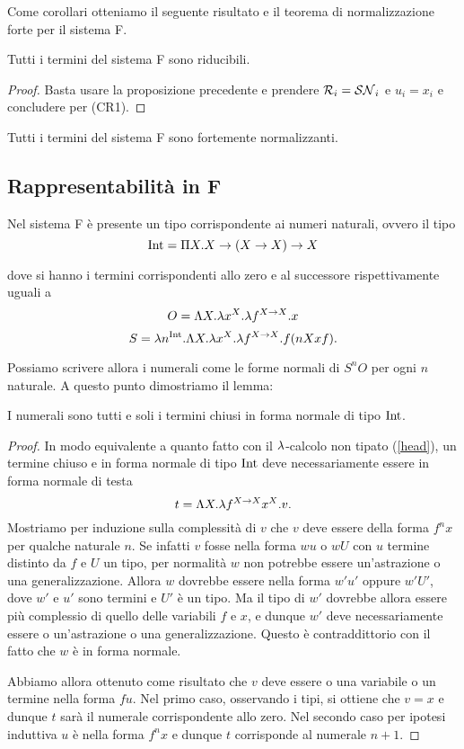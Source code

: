 \documentclass[]{marticle}
\begin{document}
Come corollari otteniamo il seguente risultato e il teorema di normalizzazione
forte per il sistema F.

\begin{block} [Proposizione]
    Tutti i termini del sistema F sono riducibili.
\begin{proof}
    Basta usare la proposizione precedente e prendere $\mathcal{R}_i=\mathcal{SN}_i$ e
    $u_i=x_i$ e concludere per (CR1).
\end{proof}
\end{block}

\begin{block} [Teorema]
    Tutti i termini del sistema F sono fortemente normalizzanti.
\end{block}


\subsection{Rappresentabilit\`a in F}

Nel sistema F \`e presente un tipo corrispondente ai numeri naturali, ovvero il
tipo
\[
    \text{Int} = \Pi X. X \rightarrow (X \rightarrow X) \rightarrow X
\]

dove si hanno i termini corrispondenti allo zero e al successore rispettivamente
uguali a
\[
    O = \Lambda X. \lambda x^{X}. \lambda f^{X\rightarrow X}. x
\]
\[
    S = \lambda n^{\text{Int}}. \Lambda X. \lambda x^X. \lambda f^{X\rightarrow X}. f (nXxf).
\]

Possiamo scrivere allora i numerali come le forme normali di $S^nO$ per ogni $n$
naturale. A questo punto dimostriamo il lemma:

\begin{block}[Lemma]
    \label{num_form}
    I numerali sono tutti e soli i termini chiusi in forma normale di tipo
    $\text{Int}$. 
\end{block}
\begin{proof}
    In modo equivalente a quanto fatto con il $\lambda$-calcolo non tipato
    (\ref{head}), un termine chiuso e in forma normale di tipo
    $\text{Int}$ deve necessariamente essere in forma normale di testa 
    \[
        t = \Lambda X. \lambda f^{X\rightarrow X} x^X. v.
    \]
    Mostriamo per induzione sulla complessit\`a di $v$ che $v$ deve essere della
    forma $f^nx$ per qualche naturale $n$.
    Se infatti $v$ fosse nella forma $wu$ o $wU$ con $u$ termine distinto da $f$
    e $U$ un tipo, per normalit\`a $w$ non potrebbe essere un'astrazione o una
    generalizzazione. Allora $w$ dovrebbe essere nella forma $w'u'$ oppure
    $w'U'$, dove $w'$ e $u'$ sono termini e $U'$ \`e un tipo. Ma il tipo di $w'$
    dovrebbe allora essere pi\`u complessio di quello delle variabili $f$ e $x$,
    e dunque $w'$ deve necessariamente essere o un'astrazione o una
    generalizzazione. Questo \`e contraddittorio con il fatto che $w$ \`e in
    forma normale. 

    Abbiamo allora ottenuto come risultato che $v$ deve essere o una variabile o
    un termine nella forma $fu$. Nel primo caso, osservando i tipi, si ottiene
    che $v=x$ e dunque $t$ sar\`a il numerale corrispondente allo zero. Nel
    secondo caso per ipotesi induttiva $u$ \`e nella forma $f^nx$ e dunque $t$
    corrisponde al numerale $n+1$.
\end{proof}
\end{document}
